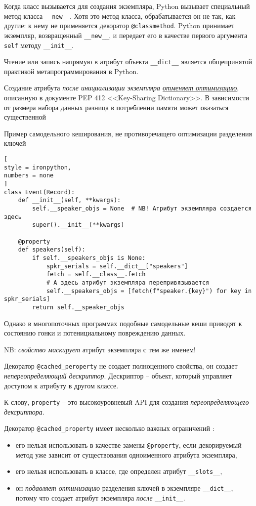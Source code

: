 \documentclass[%
	11pt,
	a4paper,
	utf8,
		]{article}
\begin{document}
Когда класс вызывается для создания экземпляра, Python вызывает специальный метод класса \verb|__new__|. Хотя это метод класса, обрабатывается он не так, как другие: к нему не применяется декоратор \verb*|@classmethod|. Python принимает экземпляр, возвращенный \verb|__new__|, и передает его в качестве первого аргумента \verb*|self| методу \verb|__init__|. 

Чтение или запись напрямую в атрибут объекта \verb*|__dict__| является общепринятой практикой метапрограммирования в Python.

{\color{red}
Создание атрибута \emph{после инициализации экземпляра \underline{отменяет оптимизацию}}, описанную в документе PEP 412 <<Key-Sharing Dictionary>>. В зависимости от размера набора данных разница в потреблении памяти может оказаться существенной
}

Пример самодельного кеширования, не противоречащего оптимизации разделения ключей \cite[]{ramalho:python-2022}
\begin{lstlisting}[
style = ironpython,
numbers = none
]
class Event(Record):
    def __init__(self, **kwargs):
        self.__speaker_objs = None  # NB! Атрибут экземпляра создается здесь
        super().__init__(**kwargs)
        
    @property
    def speakers(self):
        if self.__speakers_objs is None:
            spkr_serials = self.__dict__["speakers"]
            fetch = self.__class__.fetch
            # А здесь атрибут экземпляра перепривязывается
            self.__speakers_objs = [fetch(f"speaker.{key}") for key in spkr_serials]
        return self.__speaker_objs
\end{lstlisting}

Однако в многопоточных программах подобные самодельные кеши приводят к состоянию гонки и потенициальному повреждению данных.

{\color{red}NB: \emph{свойство маскирует} атрибут экземпляра с тем же именем! \cite[]{ramalho:python-2022}}

Декоратор \verb|@cached_peroperty| не создает полноценного свойства, он создает \emph{непереопределяющий дескриптор}. Дескриптор -- объект, который управляет доступом к атрибуту в другом классе.

К слову, \verb*|property| -- это высокоуровневый API для создания \emph{переопределяющего дексриптора}.

Декоратор \verb|@cached_property| имеет несколько важных ограничений \cite[]{ramalho:python-2022}:
\begin{itemize}
	\item его нельзя использовать в качестве замены \verb*|@property|, если декорируемый метод уже зависит от существования одноименного атрибута экземпляра,
	
	\item его нельзя использовать в классе, где определен атрибут \verb|__slots__|,
	
	\item он \emph{подавляет оптимизацию} разделения ключей в экземпляре \verb*|__dict__|, потому что создает атрибут экземпляра \emph{после} \verb|__init__|.
\end{itemize}
\end{document}
